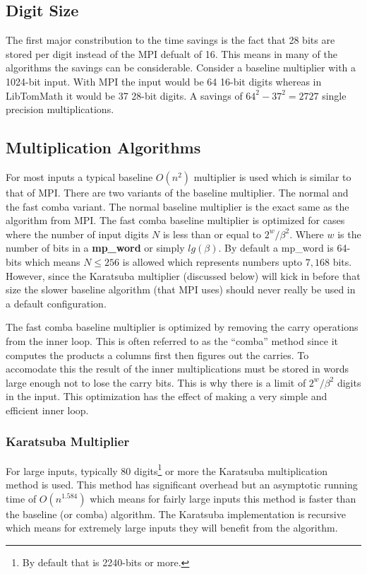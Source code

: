 \documentclass{article}
\begin{document}
\subsection{Digit Size}
The first major constribution to the time savings is the fact that 28 bits are stored per digit instead of the MPI 
defualt of 16.  This means in many of the algorithms the savings can be considerable.  Consider a baseline multiplier 
with a 1024-bit input.  With MPI the input would be 64 16-bit digits whereas in LibTomMath it would be 37 28-bit digits.
A savings of $64^2 - 37^2 = 2727$ single precision multiplications.  

\subsection{Multiplication Algorithms}
For most inputs a typical baseline $O(n^2)$ multiplier is used which is similar to that of MPI.  There are two variants 
of the baseline multiplier.  The normal and the fast comba variant.  The normal baseline multiplier is the exact same as 
the algorithm from MPI.  The fast comba baseline multiplier is optimized for cases where the number of input digits $N$ 
is less than or equal to $2^{w}/\beta^2$.  Where $w$ is the number of bits in a \textbf{mp\_word} or simply $lg(\beta)$.
By default a mp\_word is 64-bits which means $N \le 256$ is allowed which represents numbers upto $7,168$ bits.  However,
since the Karatsuba multiplier (discussed below) will kick in before that size the slower baseline algorithm (that MPI
uses) should never really be used in a default configuration.  

The fast comba baseline multiplier is optimized by removing the carry operations from the inner loop.  This is often 
referred to as the ``comba'' method since it computes the products a columns first then figures out the carries.  To
accomodate this the result of the inner multiplications must be stored in words large enough not to lose the carry bits.  
This is why there is a limit of $2^{w}/\beta^2$ digits in the input.  This optimization has the effect of making a 
very simple and efficient inner loop.

\subsubsection{Karatsuba Multiplier}
For large inputs, typically 80 digits\footnote{By default that is 2240-bits or more.} or more the Karatsuba multiplication
method is used.  This method has significant overhead but an asymptotic running time of $O(n^{1.584})$ which means for 
fairly large inputs this method is faster than the baseline (or comba) algorithm.  The Karatsuba implementation is 
recursive which means for extremely large inputs they will benefit from the algorithm.
\end{document}
